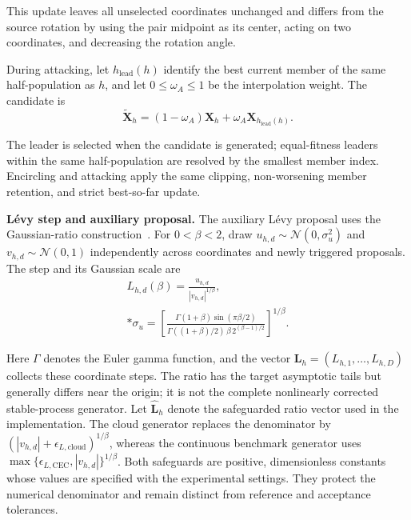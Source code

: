 \documentclass[pdflatex,onecolumn,sn-mathphys-num]{sn-jnl}
\begin{document}
This update leaves all unselected coordinates unchanged and differs from the source rotation by using the pair midpoint as its center, acting on two coordinates, and decreasing the rotation angle.

During attacking, let $h_{\mathrm{lead}}(h)$ identify the best current member of the same half-population as $h$, and let $0\leq\omega_A\leq1$ be the interpolation weight. The candidate is
\begin{equation}\label{eq:lscbo_attack}
\widetilde{\mathbf{X}}_h=(1-\omega_A)\mathbf{X}_h+\omega_A\mathbf{X}_{h_{\mathrm{lead}}(h)}.
\end{equation}

The leader is selected when the candidate is generated; equal-fitness leaders within the same half-population are resolved by the smallest member index. Encircling and attacking apply the same clipping, non-worsening member retention, and strict best-so-far update.

\medskip
\begin{samepage}
\textbf{L\'{e}vy step and auxiliary proposal.}\label{sec:levy_step}
The auxiliary L\'{e}vy proposal uses the Gaussian-ratio construction~\cite{Mantegna1994}. For $0<\beta<2$, draw $u_{h,d}\sim\mathcal{N}(0,\sigma_u^2)$ and $v_{h,d}\sim\mathcal{N}(0,1)$ independently across coordinates and newly triggered proposals. The step and its Gaussian scale are
\begin{gather}
L_{h,d}(\beta)=\frac{u_{h,d}}{|v_{h,d}|^{1/\beta}},\label{eq:mantegna_ratio}\\*
\sigma_u=\left[
\frac{\Gamma(1+\beta)\sin(\pi\beta/2)}
{\Gamma((1+\beta)/2)\,\beta\,2^{(\beta-1)/2}}
\right]^{1/\beta}.\label{eq:mantegna_scale}
\end{gather}
\end{samepage}

Here $\Gamma$ denotes the Euler gamma function, and the vector $\mathbf{L}_h=(L_{h,1},\ldots,L_{h,D})$ collects these coordinate steps. The ratio has the target asymptotic tails but generally differs near the origin; it is not the complete nonlinearly corrected stable-process generator. Let $\widehat{\mathbf{L}}_h$ denote the safeguarded ratio vector used in the implementation. The cloud generator replaces the denominator by $(|v_{h,d}|+\epsilon_{L,\mathrm{cloud}})^{1/\beta}$, whereas the continuous benchmark generator uses $\max\{\epsilon_{L,\mathrm{CEC}},|v_{h,d}|\}^{1/\beta}$. Both safeguards are positive, dimensionless constants whose values are specified with the experimental settings. They protect the numerical denominator and remain distinct from reference and acceptance tolerances.
\end{document}
